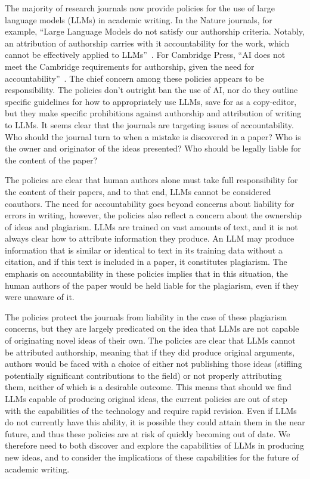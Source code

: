 The majority of research journals now provide policies for the use of large
language models (LLMs) in academic writing. In the Nature journals, for example,
``Large Language Models do not satisfy our authorship criteria. Notably, an
attribution of authorship carries with it accountability for the work, which
cannot be effectively applied to LLMs''~\citep{nature_ai_policies}. For Cambridge
Press, ``AI does not meet the Cambridge requirements for authorship, given the
need for accountability''~\citep{cambridge_ai_policies}. The chief concern among
these policies appears to be responsibility. The policies don't outright ban the
use of AI, nor do they outline specific guidelines for how to appropriately use
LLMs, save for as a copy-editor, but they make specific prohibitions against
authorship and attribution of writing to LLMs. It seems clear that the journals
are targeting issues of accountability. Who should the journal turn to when a
mistake is discovered in a paper? Who is the owner and originator of the ideas
presented? Who should be legally liable for the content of the paper? 

The policies are clear that human authors alone must take
full responsibility for the content of their papers, and to that end, LLMs
cannot be considered coauthors. The need for accountability goes beyond concerns
about liability for errors in writing, however, the policies also reflect a
concern about the ownership of ideas and plagiarism. LLMs are trained on vast 
amounts of text, and it is not always clear how to attribute information they
produce. An LLM may produce information that is similar or identical to text in
its training data without a citation, and if this text is included in a paper,
it constitutes plagiarism. The emphasis on accountability in these policies
implies that in this situation, the human authors of the paper would be held
liable for the plagiarism, even if they were unaware of it.

The policies protect the journals from liability in the case of these plagiarism
concerns, but they are largely predicated on the idea that LLMs are not capable
of originating novel ideas of their own. The policies are clear that LLMs cannot
be attributed authorship, meaning that if they did produce original arguments,
authors would be faced with a choice of either not publishing those ideas 
(stifling potentially significant contributions to the field) or not properly
attributing them, neither of which is a desirable outcome. This means that
should we find LLMs capable of producing original ideas, the current policies
are out of step with the capabilities of the technology and require rapid 
revision. Even if LLMs do not currently have this ability, it is possible they
could attain them in the near future, and thus these policies are at risk of
quickly becoming out of date. We therefore need to both discover and explore the
capabilities of LLMs in producing new ideas, and to consider the implications
of these capabilities for the future of academic writing.

